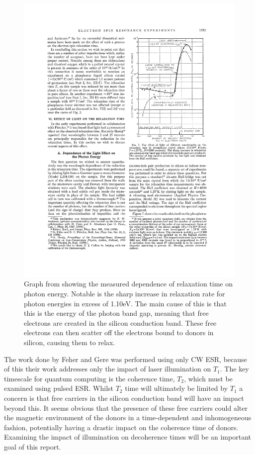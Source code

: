 \begin{figure}
\centering
\includegraphics[width = 0.75\columnwidth]{Figures/photEngDep.pdf}
\caption[$T_1$ dependence on photon energy]{Graph from \cite{Gere1959} showing the measured dependence of relaxation time on photon energy. Notable is the sharp increase in relaxation rate for photon energies in excess of 1.10eV. The main cause of this is that this is the energy of the photon band gap, meaning that free electrons are created in the silicon conduction band. These free electrons can then scatter off the electrons bound to donors in silicon, causing them to relax.}
\label{fig:phosPhotFeher}
\end{figure}

The work done by Feher and Gere was performed using only CW ESR, because of this their work addresses only the impact of laser illumination on $T_1$. 
The key timescale for quantum computing is the coherence time, $T_2$, which must be examined using pulsed ESR.
Whilst $T_2$ time will ultimately be limited by $T_1$ a concern is that free carriers in the silicon conduction band will have an impact beyond this.
It seems obvious that the presence of these free carriers could alter the magnetic environment of the donors in a time-dependent and inhomogeneous fashion, potentially having a drastic impact on the coherence time of donors.
Examining the impact of illumination on decoherence times will be an important goal of this report.

